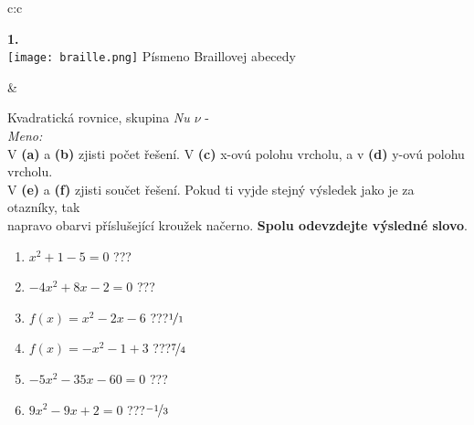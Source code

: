 \documentclass[10pt]{report}
\begin{document}
\begin{tabular}{c:c}
\begin{minipage}[c][99mm][t]{0.49\linewidth}
\begin{center}
\begin{minipage}{0.20\linewidth}
\begin{center}
{\Huge\bfseries 1.} \\[2mm]
\texttt{[image: braille.png]}
{\small Písmeno Braillovej abecedy}
\end{center}
\end{minipage}
\end{center}
\end{minipage}
&
\begin{minipage}[c][99mm][t]{0.49\linewidth}
\begin{center}
\vspace{7mm}
{\huge Kvadratická rovnice, skupina \textit{Nu $\nu$} -}\\[4.5mm]
\textit{Meno:}\phantom{xxxxxxxxxxxxxxxxxxxxxxxxxxxxxxxxxxxxxxxxxxxxxxxxxxxxxxxxxxxxxxxxx}\\[3.5mm]
V \textbf{(a)} a \textbf{(b)} zjisti počet řešení. V \textbf{(c)} x-ovú polohu vrcholu, a v \textbf{(d)} y-ovú polohu vrcholu.\\V \textbf{(e)} a \textbf{(f)} zjisti součet řešení. Pokud ti vyjde stejný výsledek jako je za otazníky, tak\\napravo obarvi příslušející kroužek načerno. \textbf{Spolu odevzdejte výsledné slovo}.\\[3mm]
\begin{minipage}{0.77\linewidth}
\begin{center}
\begin{varwidth}{\textwidth}
\begin{enumerate}
\large
\item $x^2+1-5=0$\quad \dotfill\; ???\;\dotfill {}
\item $-4x^2+8x-2=0$\quad \dotfill\; ???\;\dotfill {}
\item $f(x)=x^2-2x-6$\quad \dotfill\; ???\;\dotfill \quad $\nicefrac{1}{1}$
\item $f(x)=-x^2-1+3$\quad \dotfill\; ???\;\dotfill \quad $\nicefrac{7}{4}$
\item $-5x^2-35x-60=0$\quad \dotfill\; ???\;\dotfill {}
\item $9x^2-9x+2=0$\quad \dotfill\; ???\;\dotfill \quad $\nicefrac{-1}{3}$
\end{enumerate}
\end{varwidth}
\end{center}
\end{minipage}
\begin{minipage}{0.20\linewidth}
\begin{center}

\end{center}
\end{minipage}
\end{center}
\end{minipage}
\end{tabular}
\end{document}
